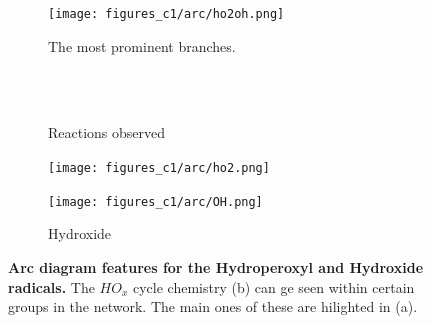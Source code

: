 \begin{figure}[H]
     \centering
      \begin{subfigure}[b]{.4\textwidth}
         \centering
         \texttt{[image: figures\_c1/arc/ho2oh.png]}
         \caption{The most prominent branches. }
         \label{fig:ho2oh}
     \end{subfigure}
      \begin{subfigure}[b]{.4\textwidth}
         \centering
            \\ \ \\
    \hfill
         \caption{Reactions observed}
         \label{fig:rxnho2oh}
     \end{subfigure}
     \begin{subfigure}[b]{.4\textwidth}
         \centering
         \texttt{[image: figures\_c1/arc/ho2.png]}
         \caption{}
         \label{fig:ho2}
     \end{subfigure}
     \begin{subfigure}[b]{.4\textwidth}
         \centering
         \texttt{[image: figures\_c1/arc/OH.png]}
         \caption{Hydroxide}
         \label{fig:oh}
     \end{subfigure}
      \caption{\textbf{ Arc diagram features for the Hydroperoxyl and Hydroxide radicals.} The $HO_x$ cycle chemistry (b) can ge seen within certain groups in the network. The main ones of these are hilighted in (a).   }
        \label{fig:ohho2}
\end{figure}



